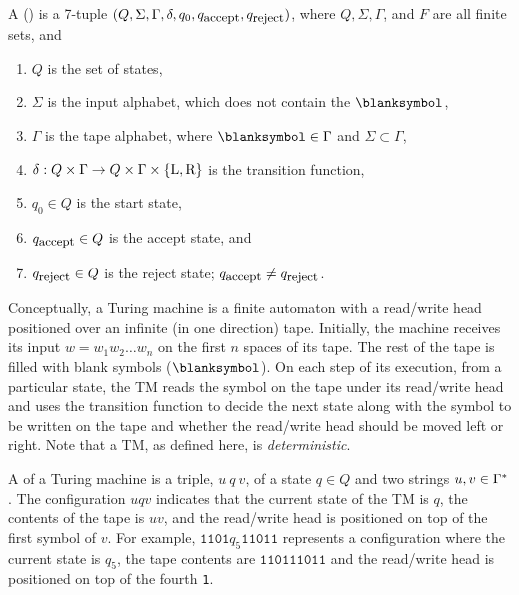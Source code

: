 \documentclass[twoside,letterpaper,openany]{book}
\begin{document}
\begin{defn}
A  () is a 7-tuple $(Q, \Sigma, \Gamma, \delta, q_0, q_\textrm{\small accept},q_\textrm{\small reject} )$, where $Q, \Sigma, \Gamma$, and $F$ are all finite sets, and
\begin{enumerate}
\item $Q$ is the set of states,
\item $\Sigma$ is the input alphabet, which does not contain the  $\blanksymbol$,
\item $\Gamma$ is the tape alphabet, where $\blanksymbol \in \Gamma$ and $\Sigma \subset \Gamma$,
\item $\delta: Q \times \Gamma \rightarrow Q \times \Gamma \times \left\lbrace \textrm{L}, \textrm{R} \right\rbrace$ is the transition function,
\item $q_0 \in Q$ is the start state,
\item $q_\textrm{\small accept} \in Q$ is the accept state, and
\item $q_\textrm{\small reject} \in Q$ is the reject state; $q_\textrm{\small accept} \neq q_\textrm{\small reject}$.
\end{enumerate}
\end{defn}

\begin{discussion}
Conceptually, a Turing machine is a finite automaton with a read/write head positioned over an infinite (in one direction) tape. Initially, the machine receives its input $w = w_1 w_2 \ldots w_n$ on the first $n$ spaces of its tape. The rest of the tape is filled with blank symbols ($\blanksymbol$). On each step of its execution, from a particular state, the TM reads the symbol on the tape under its read/write head and uses the transition function to decide the next state along with the symbol to be written on the tape and whether the read/write head should be moved left or right. Note that a TM, as defined here, is \emph{deterministic}. 
\end{discussion}

\begin{defn}
A  of a Turing machine is a triple, $u~q~v$, of a state $q \in Q$ and two strings $u, v \in \Gamma^{*}$. The configuration $uqv$ indicates that the current state of the TM is $q$, the contents of the tape is $uv$, and the read/write head is positioned on top of the first symbol of $v$. For example, $\texttt{1101}q_5\texttt{11011}$ represents a configuration where the current state is $q_5$, the tape contents are $\texttt{110111011}$ and the read/write head is positioned on top of the fourth \texttt{1}.
\end{defn}
\end{document}
